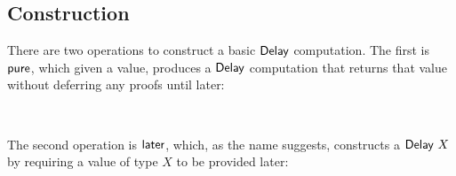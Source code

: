 \documentclass[sigplan]{acmart}%
\begin{document}
\subsection{Construction}
There are two operations to construct a basic $\AgdaDatatype{Delay}$ computation.
The first is $\AgdaFunction{pure}$, which given a value, produces a $\AgdaDatatype{Delay}$
computation that returns that value without deferring any proofs until later:
\begin{code}
\>[2]\AgdaSpace{}%
\AgdaSymbol{:}\AgdaSpace{}%
\AgdaSpace{}%
\AgdaSpace{}%
\AgdaSpace{}%
\<%
\\
%
\>[2]\AgdaSpace{}%
\AgdaSpace{}%
\AgdaSymbol{=}\AgdaSpace{}%
\AgdaSpace{}%
\AgdaInductiveConstructor{[]}\AgdaSpace{}%
\AgdaSymbol{(}\AgdaSpace{}%
\AgdaSymbol{)}\<%
\end{code}
The second operation is $\AgdaFunction{later}$, which, as the name suggests, 
constructs a $\AgdaDatatype{Delay}\ X$ by requiring a value of type $X$ to be 
provided later: 
\begin{code}
\>[2]\AgdaSpace{}%
\AgdaSymbol{:}\AgdaSpace{}%
\AgdaSymbol{\}}\AgdaSpace{}%
\AgdaSpace{}%
\AgdaSpace{}%
\<%
\\
%
\>[2]\AgdaSpace{}%
\AgdaSymbol{\{}\AgdaSymbol{\}}\AgdaSpace{}%
\AgdaSymbol{=}\AgdaSpace{}%
\AgdaSpace{}%
\AgdaSymbol{(}\AgdaSpace{}%
\AgdaSpace{}%
\AgdaInductiveConstructor{[]}\AgdaSymbol{)}\AgdaSpace{}%
\AgdaSpace{}%
\AgdaSymbol{\{}\AgdaSpace{}%
\AgdaSymbol{(}\AgdaSpace{}%
\AgdaSpace{}%
\AgdaInductiveConstructor{[]]}\AgdaSymbol{)}\AgdaSpace{}%
\AgdaSpace{}%
\AgdaSpace{}%
\AgdaSymbol{\}}\<%
\end{code}
\end{document}
